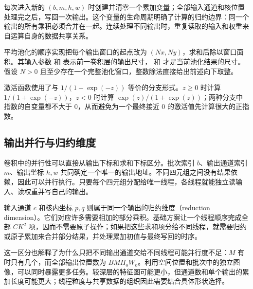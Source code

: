 \noindent\begin{minipage}{\linewidth}

\end{minipage}

每次进入新的 $(b,m,h,w)$ 时创建并清零一个累加变量；全部输入通道和核位置处理完之后，写回一次输出。这个变量的生命周期明确了计算的归约边界：同一个输出的所有乘积必须合并在一起。连续处理不同输出时，重复读取的输入和权重来自运算自身的数据共享关系。

平均池化的顺序实现把每个输出窗口的起点改为 $(Nx,Ny)$，求和后除以窗口面积。其输入参数  和  表示前一卷积层的输出尺寸， 和  才是当前池化结果的尺寸。假设 $N>0$ 且至少存在一个完整池化窗口，整数除法直接给出前述向下取整。

\noindent\begin{minipage}{\linewidth}

\end{minipage}

激活函数使用了与 $1/(1+\exp(-z))$ 等价的分支形式。$z\ge0$ 时计算 $1/(1+\exp(-z))$，$z<0$ 时计算 $\exp(z)/(1+\exp(z))$；两种分支中指数的自变量都不大于 $0$，从而避免为一个最终接近 $0$ 的激活值先计算很大的正指数。

\subsection{输出并行与归约维度}
\label{l11:subsec:parallel_axes}

卷积中的并行性可以直接从输出下标和求和下标区分。批次索引 $b$、输出通道索引 $m$、输出坐标 $h,w$ 共同确定一个唯一的输出地址。不同四元组之间没有结果依赖，因此可以并行执行。只要每个四元组分配给唯一线程，各线程就能独立读输入、读权重并写自己的输出。

输入通道 $c$ 和核内坐标 $p,q$ 则属于同一个输出的归约维度（reduction dimension）。它们对应许多需要相加的部分乘积。基础方案让一个线程顺序完成全部 $CK^2$ 项，因而不需要原子操作；如果把这些求和项分给不同线程，就需要归约或原子累加来合并部分结果，并处理累加初值与最终写回的时序。

这一区分也解释了为什么只把不同输出通道交给不同线程可能并行度不足：$M$ 有时只有几个，而全部输出位置数为 $BMH_{\mathrm{o}}W_{\mathrm{o}}$。利用空间位置和批次中的独立图像，可以同时暴露更多任务。较深层的特征图可能更小，但通道数和单个输出的累加长度可能更大；线程粒度与共享数据的组织因此需要结合具体形状选择。
